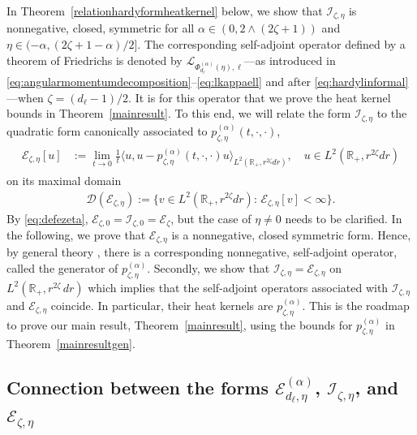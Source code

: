 \documentclass[12pt,reqno]{amsart}
\theoremstyle{definition}
\theoremstyle{remark}
\numberwithin{equation}{section}
\newcommand{\1}{\mathbbm{1}}
\newcommand{\D}{\mathcal{D}}
\newcommand{\R}{\mathbb{R}}
\def\ce{\mathcal{E}}
\def\ci{\mathcal{I}}
\def\cl{\mathcal{L}}
\begin{document}
In Theorem~\ref{relationhardyformheatkernel} below, we show that $\ci_{\zeta,\eta}$ is nonnegative, closed, symmetric for all $\alpha\in(0,2\wedge(2\zeta+1))$ and $\eta\in(-\alpha,(2\zeta+1-\alpha)/2]$. The corresponding self-adjoint operator defined by a theorem of Friedrichs \cite[Theorem~1.3.1]{Fukushimaetal2011} is denoted by $\cl_{\Phi_{d_\ell}^{(\alpha)}(\eta),\ell}$---as introduced in \eqref{eq:angularmomentumdecomposition}--\eqref{eq:lkappaell} and after \eqref{eq:hardylinformal}---when $\zeta=(d_\ell-1)/2$. It is for this operator that we prove the heat kernel bounds in Theorem~\ref{mainresult}. To this end, we will relate the form $\ci_{\zeta,\eta}$ to the quadratic form canonically associated to $p_{\zeta,\eta}^{(\alpha)}(t,\cdot,\cdot)$, 
\begin{align}
  \label{eq:defezetaeta}
  \begin{split}
    \ce_{\zeta,\eta}[u]
    & := \lim_{t\to0}\frac1t\langle u,u-p_{\zeta,\eta}^{(\alpha)}(t,\cdot,\cdot)u\rangle_{L^2(\R_+,r^{2\zeta}dr)},\quad u\in L^2(\R_+,r^{2\zeta}dr)
  \end{split}
\end{align}\index{$\ce_{\zeta,\eta}$}on its maximal domain
\begin{align}
  \D(\ce_{\zeta,\eta}) := \{v\in L^2(\R_+,r^{2\zeta}dr):\,\ce_{\zeta,\eta}[v]<\infty\}.
\end{align}
By \eqref{eq:defezeta}, $\ce_{\zeta,0}=\ci_{\zeta,0}=\ce_\zeta$, but the case of $\eta\neq 0$ needs to be clarified.
In the following, we prove that $\ce_{\zeta,\eta}$ is a nonnegative, closed symmetric form. Hence, by general theory \cite[Section~1.3]{Fukushimaetal2011}, there is a corresponding nonnegative, self-adjoint operator, called the generator of $p_{\zeta,\eta}^{(\alpha)}$. Secondly, we show that $\ci_{\zeta,\eta}=\ce_{\zeta,\eta}$ on $L^2(\R_+,r^{2\zeta}\,dr)$ which implies that the self-adjoint operators associated with $\ci_{\zeta,\eta}$ and $\ce_{\zeta,\eta}$ coincide. In particular, their heat kernels are $p_{\zeta,\eta}^{(\alpha)}$. This is the roadmap to prove our main result, Theorem~\ref{mainresult}, using the bounds for $p_{\zeta,\eta}^{(\alpha)}$ in Theorem~\ref{mainresultgen}.


\subsection{Connection between the forms $\ce_{d_\ell,\eta}^{(\alpha)}$, $\ci_{\zeta,\eta}$, and $\ce_{\zeta,\eta}$}
\label{s:notation}
\end{document}
